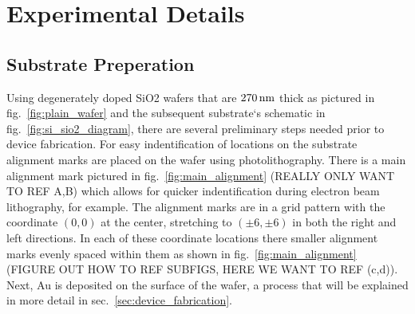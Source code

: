 \chapter{Experimental Details}\label{chap:exp_details}

\section{Substrate Preperation}\label{sec:sample_prep}
Using degenerately doped \ac{SiO2} wafers that are $270\,\mathrm{nm}$ thick as pictured in fig.~\ref{fig:plain_wafer} and the subsequent substrate`s schematic in fig.~\ref{fig:si_sio2_diagram}, there are several preliminary steps needed prior to device fabrication. For easy indentification of locations on the substrate alignment marks are placed on the wafer using photolithography. There is a main alignment mark pictured in fig.~\ref{fig:main_alignment} (REALLY ONLY WANT TO REF A,B) which allows for quicker indentification during electron beam lithography, for example. The alignment marks are in a grid pattern with the coordinate $\left(0,0\right)$ at the center, stretching to $\left(\pm 6,\pm 6\right)$ in both the right and left directions. In each of these coordinate locations there smaller alignment marks evenly spaced within them as shown in fig.~\ref{fig:main_alignment} (FIGURE OUT HOW TO REF SUBFIGS, HERE WE WANT TO REF (c,d)). Next, \ac{Au} is deposited on the surface of the wafer, a process that will be explained in more detail in sec.~\ref{sec:device_fabrication}.
